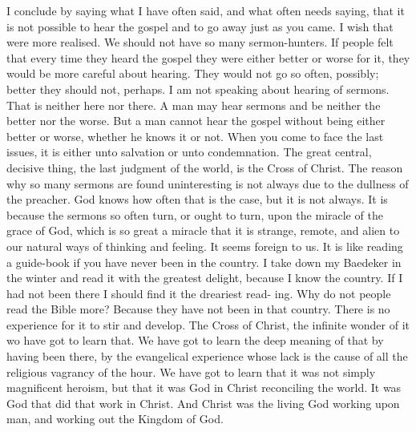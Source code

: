 \documentclass[12pt,letterpaper]{article}
\begin{document}
I conclude by saying what I have often said, 
and what often needs saying, that it is not 
possible to hear the gospel and to go away just 
as you came. I wish that were more realised. 
We should not have so many sermon-hunters. 
If people felt that every time they heard the 
gospel they were either better or worse for it, 
they would be more careful about hearing. 
They would not go so often, possibly; better they 
should not, perhaps. I am not speaking about 
hearing of sermons. That is neither here nor 
there. A man may hear sermons and be neither 
the better nor the worse. But a man cannot 
hear the gospel without being either better or 
worse, whether he knows it or not. When you 
come to face the last issues, it is either unto 
salvation or unto condemnation. The great 
central, decisive thing, the last judgment of the 
world, is the Cross of Christ. The reason why 
so many sermons are found uninteresting is not 
always due to the dullness of the preacher. God 
knows how often that is the case, but it is not 
always. It is because the sermons so often turn, 
or ought to turn, upon the miracle of the grace 
of God, which is so great a miracle that it is 
strange, remote, and alien to our natural ways 
of thinking and feeling. It seems foreign to us. 
It is like reading a guide-book if you have never 
been in the country. I take down my Baedeker 
in the winter and read it with the greatest 
delight, because I know the country. If I had 
not been there I should find it the dreariest read- 
ing. Why do not people read the Bible more? 
Because they have not been in that country. 
There is no experience for it to stir and develop. 
The Cross of Christ, the infinite wonder of it 
wo have got to learn that. We have got to 
learn the deep meaning of that by having been 
there, by the evangelical experience whose lack 
is the cause of all the religious vagrancy of the 
hour. We have got to learn that it was not 
simply magnificent heroism, but that it was God 
in Christ reconciling the world. It was God 
that did that work in Christ. And Christ was 
the living God working upon man, and working 
out the Kingdom of God. 
\end{document}
